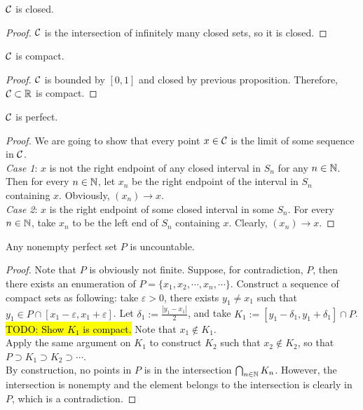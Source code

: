 \documentclass[11pt]{article}
\begin{document}
	\begin{proposition}
		$\mathcal{{C}}$ is closed.
	\end{proposition}
	
	\begin{proof}
		$\mathcal{{C}}$ is the intersection of infinitely many closed sets, so it is closed.
	\end{proof}

	\begin{proposition}
		$\mathcal{{C}}$ is compact.
	\end{proposition}
	
	\begin{proof}
		$\mathcal{{C}}$ is bounded by $[0, 1]$ and closed by previous proposition. Therefore, $\mathcal{{C}} \subset \mathbb{R}$ is compact.
	\end{proof}
	
	\begin{proposition}
		$\mathcal{{C}}$ is perfect.
	\end{proposition}
	
	\begin{proof}
		We are going to show that every point $x \in \mathcal{{C}}$ is the limit of some sequence in $\mathcal{{C}}$. \\
		\emph{Case 1}: $x$ is not the right endpoint of any closed interval in $S_n$ for any $n \in \mathbb{N}$. Then for every $n \in \mathbb{N}$, let $x_n$ be the right endpoint of the interval in $S_n$ containing $x$. Obviously, $(x_n) \to x$. \\
		\emph{Case 2}: $x$ is the right endpoint of some closed interval in some $S_n$. For every $n \in \mathbb{N}$, take $x_n$ to be the left end of $S_n$ containing $x$. Clearly, $(x_n) \to x$.
	\end{proof}
	
	\begin{theorem}
		Any nonempty perfect set $P$ is uncountable.
	\end{theorem}
	
	\begin{proof}
		Note that $P$ is obviously not finite. Suppose, for contradiction, $P$, then there exists an enumeration of $P = \{x_1, x_2, \cdots, x_n, \cdots \}$. Construct a sequence of compact sets as following: take $\varepsilon > 0$, there exists $y_1 \neq x_1$ such that $y_1 \in P \cap [x_1 - \varepsilon, x_1 + \varepsilon]$. Let $\delta_1 := \frac{|y_1 - x_1|}{2}$, and take $K_1 := [y_1 - \delta_1, y_1 + \delta_1] \cap P$. \hl{TODO: Show $K_1$ is compact.} Note that $x_1 \notin K_1$. \\
		Apply the same argument on $K_1$ to construct $K_2$ such that $x_2 \notin K_2$, so that $P \supset K_1 \supset K_2 \supset \cdots $. \\
		By construction, no points in $P$ is in the intersection $\bigcap_{n \in \mathbb{N}} K_n$. However, the intersection is nonempty and the element belongs to the intersection is clearly in $P$, which is a contradiction. 
	\end{proof}
\end{document}
